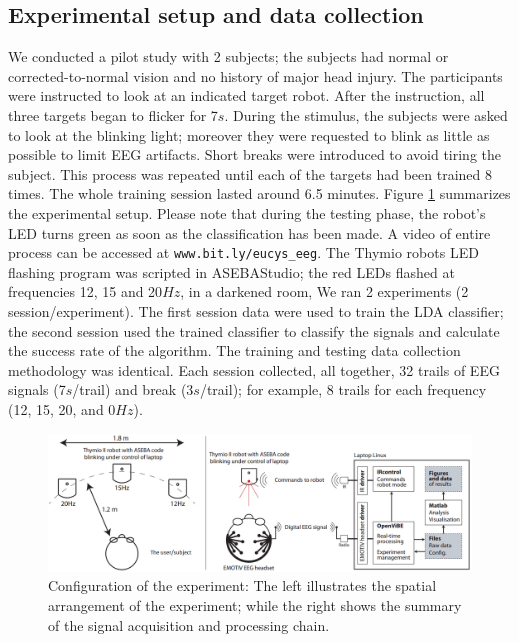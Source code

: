 \documentclass{svmult}
\begin{document}
\subsection{Experimental setup and data collection}
We conducted a pilot study with 2 subjects; the subjects had normal or corrected-to-normal vision and no history of major head injury. The participants were instructed to look at an indicated target robot. After the instruction, all three targets began to flicker for 7$s$. During the stimulus, the subjects were asked to look at the blinking light; moreover they were requested to blink as little as possible to limit EEG artifacts. Short breaks were introduced to avoid tiring the subject. This process was repeated until each of the targets had been trained 8 times. The whole training session lasted around 6.5 minutes. Figure \ref{fig:thymioinstall} summarizes the experimental setup. Please note that during the testing phase, the robot's LED turns green as soon as the classification has been made. A video of entire process can be accessed at \verb"www.bit.ly/eucys_eeg". The Thymio robots LED flashing program was scripted in ASEBAStudio; the red LEDs flashed at frequencies 12, 15 and 20$Hz$, in a darkened room, We ran 2 experiments (2 session/experiment). The first session data were used to train the LDA classifier; the second session used the trained classifier to classify the signals and calculate the success rate of the algorithm. The training and testing data collection methodology was identical. Each session collected, all together, 32 trails of EEG signals (7$s$/trail) and break (3$s$/trail); for example, 8 trails for each frequency (12, 15, 20, and 0$Hz$). 

\begin{figure}
\center
\includegraphics[width=\textwidth]{figures/Untitled.png}
\caption{Configuration of the experiment: The left illustrates the spatial arrangement of the experiment; while the right shows the summary of the signal acquisition and processing chain.} \label{fig:thymioinstall}
\end{figure}
\end{document}
